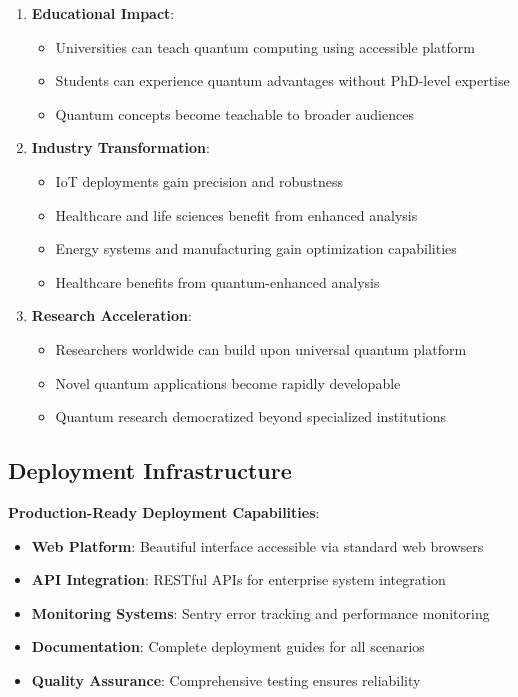 \documentclass[12pt,a4paper]{article}
\begin{document}
\begin{enumerate}
    \item \textbf{Educational Impact}:
    \begin{itemize}
        \item Universities can teach quantum computing using accessible platform
        \item Students can experience quantum advantages without PhD-level expertise
        \item Quantum concepts become teachable to broader audiences
    \end{itemize}
    
    \item \textbf{Industry Transformation}:
    \begin{itemize}
        \item IoT deployments gain precision and robustness
        \item Healthcare and life sciences benefit from enhanced analysis
        \item Energy systems and manufacturing gain optimization capabilities
        \item Healthcare benefits from quantum-enhanced analysis
    \end{itemize}
    
    \item \textbf{Research Acceleration}:
    \begin{itemize}
        \item Researchers worldwide can build upon universal quantum platform
        \item Novel quantum applications become rapidly developable
        \item Quantum research democratized beyond specialized institutions
    \end{itemize}
\end{enumerate}

\subsection{Deployment Infrastructure}

\textbf{Production-Ready Deployment Capabilities}:
\begin{itemize}
    \item \textbf{Web Platform}: Beautiful interface accessible via standard web browsers
    \item \textbf{API Integration}: RESTful APIs for enterprise system integration
    \item \textbf{Monitoring Systems}: Sentry error tracking and performance monitoring
    \item \textbf{Documentation}: Complete deployment guides for all scenarios
    \item \textbf{Quality Assurance}: Comprehensive testing ensures reliability
\end{itemize}
\end{document}
